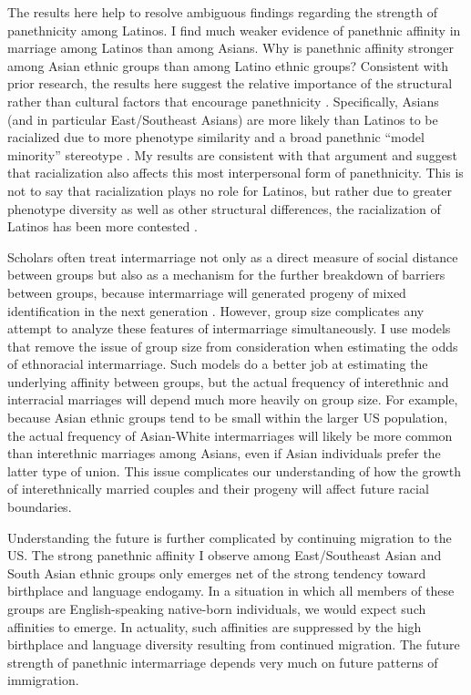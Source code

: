 \documentclass[11pt,]{article}
\begin{document}
The results here help to resolve ambiguous findings regarding the strength of panethnicity among Latinos. I find much weaker evidence of panethnic affinity in marriage among Latinos than among Asians. Why is panethnic affinity stronger among Asian ethnic groups than among Latino ethnic groups? Consistent with prior research, the results here suggest the relative importance of the structural rather than cultural factors that encourage panethnicity \citep{lopez_panethnicity_1990}. Specifically, Asians (and in particular East/Southeast Asians) are more likely than Latinos to be racialized due to more phenotype similarity and a broad panethnic ``model minority'' stereotype \citep{lopez_panethnicity_1990, kibria_construction_1997, rosenfeld_salience_2001}. My results are consistent with that argument and suggest that racialization also affects this most interpersonal form of panethnicity. This is not to say that racialization plays no role for Latinos, but rather due to greater phenotype diversity as well as other structural differences, the racialization of Latinos has been more contested \citep{rodriguez_changing_2000a, frank_latino_2010a, fox_defining_2013}.

Scholars often treat intermarriage not only as a direct measure of social distance between groups but also as a mechanism for the further breakdown of barriers between groups, because intermarriage will generated progeny of mixed identification in the next generation \citep{gordon_assimilation_1964}. However, group size complicates any attempt to analyze these features of intermarriage simultaneously. I use models that remove the issue of group size from consideration when estimating the odds of ethnoracial intermarriage. Such models do a better job at estimating the underlying affinity between groups, but the actual frequency of interethnic and interracial marriages will depend much more heavily on group size. For example, because Asian ethnic groups tend to be small within the larger US population, the actual frequency of Asian-White intermarriages will likely be more common than interethnic marriages among Asians, even if Asian individuals prefer the latter type of union. This issue complicates our understanding of how the growth of interethnically married couples and their progeny will affect future racial boundaries.

Understanding the future is further complicated by continuing migration to the US. The strong panethnic affinity I observe among East/Southeast Asian and South Asian ethnic groups only emerges net of the strong tendency toward birthplace and language endogamy. In a situation in which all members of these groups are English-speaking native-born individuals, we would expect such affinities to emerge. In actuality, such affinities are suppressed by the high birthplace and language diversity resulting from continued migration. The future strength of panethnic intermarriage depends very much on future patterns of immigration.



\renewcommand\refname{References}

\end{document}

